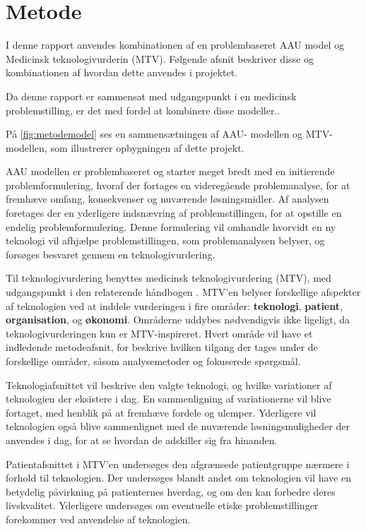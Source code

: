 \chapter{Metode} \label{metode}
I denne rapport anvendes kombinationen af en problembaseret AAU model og Medicinsk teknologivurderin (MTV). Følgende afsnit beskriver disse og kombinationen af hvordan dette anvendes i projektet. 

Da denne rapport er sammensat med udgangspunkt i en medicinsk problemstilling, er det med fordel at kombinere disse modeller..

På \ref{fig:metodemodel} ses en sammensætningen af AAU- modellen og MTV-modellen, som illustrerer opbygningen af dette projekt.

AAU modellen er problembaseret og starter meget bredt med en initierende problemformulering, hvoraf der fortages en videregående problemanalyse, for at fremhæve omfang, konsekvenser og nuværende løsningsmidler. 
Af analysen foretages der en yderligere indsnævring af problemstillingen, for at opstille en endelig problemformulering. Denne formulering vil omhandle hvorvidt en ny teknologi vil afhjælpe problemstillingen, som problemanalysen belyser, og forsøges besvaret gennem en teknologivurdering. 




Til teknologivurdering benyttes medicinsk teknologivurdering (MTV), med udgangspunkt i den relaterende håndbogen \citep{mtvhaandbog}. 
MTV'en belyser forskellige afspekter af teknologien ved at inddele vurderingen i fire områder: \textbf{teknologi}, \textbf{patient}, \textbf{organisation}, og \textbf{økonomi}. Områderne uddybes nødvendigvis ikke ligeligt, da teknologivurderingen kun er MTV-inspireret. 
Hvert område vil have et indledende metodeafsnit, for beskrive hvilken tilgang der tages under de forskellige områder, såsom analysemetoder og fokuserede spørgsmål. 

Teknologiafsnittet vil beskrive den valgte teknologi, og hvilke variationer af teknologien der eksistere i dag. En sammenligning af variationerne vil blive fortaget, med henblik på at fremhæve fordele og ulemper. Yderligere vil teknologien også blive sammenlignet med de nuværende løsningsmuligheder der anvendes i dag, for at se hvordan de adskiller sig fra hinanden.  

Patientafsnittet i MTV’en undersøges den afgrænsede patientgruppe nærmere i forhold til teknologien. Der undersøges blandt andet om teknologien vil have en betydelig påvirkning på patienternes hverdag, og om den kan forbedre deres livskvalitet. Yderligere undersøges om eventuelle etiske problemstillinger forekommer ved anvendelse af teknologien.

